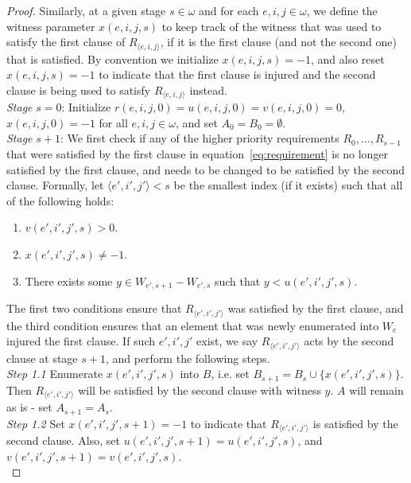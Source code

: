 \documentclass{article}
\begin{document}
\begin{proof}
    Similarly, at a given stage $s\in\omega$ and for each $e,i,j\in\omega$,
    we define the witness parameter $x(e,i,j,s)$ to keep track of
    the witness that was used to satisfy the first clause of $R_{\langle
    e,i,j\rangle}$, if it is the first clause (and not the second one) that
    is satisfied. By convention we initialize $x(e,i,j,s)=-1$, and also
    reset $x(e,i,j,s)=-1$ to indicate that the first clause is injured and
    the second clause is being used to satisfy $R_{\langle e,i,j\rangle}$
    instead. \\

    \textit{Stage} $s=0$: Initialize $r(e,i,j,0)=u(e,i,j,0)=v(e,i,j,0)=0$,
    $x(e,i,j,0)=-1$ for all $e,i,j\in\omega$, and set $A_0=B_0=\emptyset$.
    \\

    \textit{Stage} $s+1$: We first check if any of the higher priority
    requirements $R_0,\ldots,R_{s-1}$ that were satisfied by the first
    clause in equation~\eqref{eq:requirement} is no longer satisfied by the
    first clause, and needs to be changed to be satisfied by the second
    clause. Formally, let $\langle e',i',j'\rangle <s$ be the smallest
    index (if it exists) such that all of the following holds:

    \begin{enumerate}
      \item $v(e',i',j',s)>0$.
      \item $x(e',i',j',s)\neq-1$.
      \item There exists some $y\in W_{e',s+1}-W_{e',s}$ such that
        $y<u(e',i',j',s)$.
    \end{enumerate}

    The first two conditions ensure that $R_{\langle e',i',j'\rangle}$ was
    satisfied by the first clause, and the third condition ensures that an
    element that was newly enumerated into $W_e$ injured the first clause.
    If such $e',i',j'$ exist, we say $R_{\langle e',i',j'\rangle}$ acts by
    the second clause at stage $s+1$, and perform the following steps. \\

    \textit{Step 1.1} Enumerate $x(e',i',j',s)$ into $B$, i.e. set
    $B_{s+1}=B_{s}\cup\{x(e',i',j',s)\}$. Then $R_{\langle
    e',i',j'\rangle}$ will be satisfied by the second clause with witness
    $y$. $A$ will remain as is - set $A_{s+1}=A_s$. \\
    
    \textit{Step 1.2} Set $x(e',i',j',s+1)=-1$ to indicate that $R_{\langle
    e',i',j'\rangle}$ is satisfied by the second clause. Also, set
    $u(e',i',j',s+1)=u(e',i',j',s)$, and $v(e',i',j',s+1)=v(e',i',j',s)$.
    \\


\end{proof}
\end{document}
